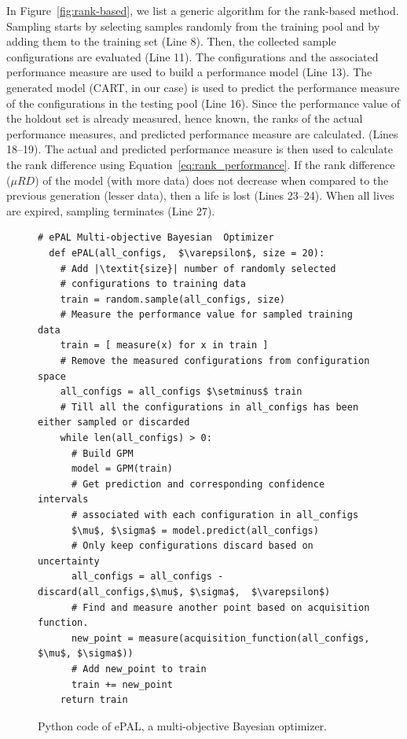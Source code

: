 In Figure~\ref{fig:rank-based}, we list a generic algorithm for the rank-based method. Sampling starts by selecting samples randomly from the training pool and by adding them to the training set (Line 8). Then, the collected sample configurations are evaluated (Line 11). The configurations and the associated performance measure are used to build a performance model (Line 13). The generated model (CART, in our case) is used to predict the performance measure of the configurations in the testing pool (Line 16). Since the performance value of the holdout set is already measured, hence known, the ranks of the actual performance measures, and predicted performance measure are calculated. (Lines 18--19). The actual and predicted performance measure is then used to calculate the rank difference using Equation~\ref{eq:rank_performance}. If the rank difference ($\mu RD$) of the model (with more data) does not decrease when compared to the previous generation (lesser data), then a life is lost (Lines 23--24). When all lives are expired, sampling terminates (Line 27).
\begin{figure}[!t]
\hspace{0.4cm}\begin{lstlisting}[xrightmargin=5.0ex,mathescape,frame=none,numbers=right]
  # ePAL Multi-objective Bayesian  Optimizer
  def ePAL(all_configs,  $\varepsilon$, size = 20):  
    # Add |\textit{size}| number of randomly selected 
    # configurations to training data
    train = random.sample(all_configs, size)
    # Measure the performance value for sampled training data
    train = [ measure(x) for x in train ]
    # Remove the measured configurations from configuration space
    all_configs = all_configs $\setminus$ train  
    # Till all the configurations in all_configs has been either sampled or discarded 
    while len(all_configs) > 0:
      # Build GPM
      model = GPM(train)
      # Get prediction and corresponding confidence intervals
      # associated with each configuration in all_configs
      $\mu$, $\sigma$ = model.predict(all_configs)
      # Only keep configurations discard based on uncertainty 
      all_configs = all_configs - discard(all_configs,$\mu$, $\sigma$,  $\varepsilon$)
      # Find and measure another point based on acquisition function.
      new_point = measure(acquisition_function(all_configs, $\mu$, $\sigma$))
      # Add new_point to train 
      train += new_point
    return train 
\end{lstlisting}
\caption{\small{Python code of ePAL, a multi-objective Bayesian optimizer.}}
\label{fig:ePAL}  
\end{figure}

